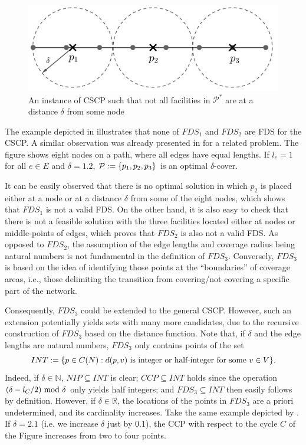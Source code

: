 \begin{figure}
	\centering
	\includegraphics{Chaptercflg/media/discrete-covering2.png}
	\caption{An instance of CSCP such that not all facilities in $\mathcal{P}^*$ are at a distance $\delta$ from some node}
	\label{fig:exDiscrete}
\end{figure}
The example depicted in  illustrates that none of $FDS_1$ and $FDS_2$ are FDS for the CSCP. A similar observation was already presented in \cite{Kalsics} for a related problem. The figure shows eight nodes on a path, where all edges have equal lengths. If $l_e=1$ for all $e\in E$ and $\delta=1.2$, $\mathcal P:=\{p_1,p_2,p_3\}$ is an optimal $\delta$-cover.

It can be easily observed that there is no optimal solution in which $p_2$ is placed either at a node or at a distance $\delta$ from some of the eight nodes, which shows that $FDS_1$ is not a valid FDS. On the other hand, it is also easy to check that there is not a feasible solution with the three facilities located either at nodes or middle-points of edges, which proves that $FDS_2$ is also not a valid FDS. As opposed to $FDS_2$, the assumption of the edge lengths and coverage radius being natural numbers is not fundamental in the definition of $FDS_3$. Conversely, $FDS_3$ is based on the idea of identifying those points at the ``boundaries'' of coverage areas, i.e., those delimiting the transition from covering/not covering a specific part of the network.


Consequently, $FDS_3$  could be extended to the general CSCP. However, such an extension potentially yields sets with many more candidates, due to the recursive construction of $FDS_3$ based on the distance function. Note that, if $\delta$ and the edge lengths are natural numbers, $FDS_3$ only contains points of the set
$$INT:=\{p\in C(N): d(p,v)\textup{ is integer or half-integer for some } v\in V\}.$$
Indeed, if $\delta\in \mathbb{N}$, $NIP\subseteq INT$ is clear; $CCP\subseteq INT$ holds since the operation $(\delta-{l_C}/{2})\textup{ mod } \delta$ only yields half integers; and $FDS_3\subseteq INT$ then easily follows by definition. However, if $\delta\in \mathbb{R}$, the locations of the points in $FDS_3$ are a priori undetermined, and its cardinality increases. Take the same example depicted by . If $\delta=2.1$ (i.e. we increase $\delta$ just by 0.1), the CCP with respect to the cycle $C$ of the Figure increases from two to four points.






